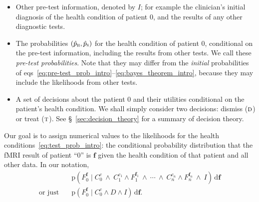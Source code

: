 \documentclass[%
]{frontiersSCNS-nologo} %
\newcommand*{\sect}{\S} %
\newcommand*{\eqns}{eqs}
\newcommand*{\di}{\mathrm{d}}%
\newcommand*{\pf}{\mathrm{p}}%
\renewcommand*{\|}{\mathpunct{|}}%
\newcommand*{\Land}{\mathbin{\ \land\ }}
\newcommand*{\yH}{C}
\newcommand*{\yh}{c}
\newcommand*{\yhu}{\textsc{h}}
\newcommand*{\yhd}{\textsc{s}}
\newcommand*{\yD}{D}
\newcommand*{\yF}{F}
\newcommand*{\yf}{\bm{f}}
\newcommand*{\ypph}{\Hat{p}_{\yhu}}
\newcommand*{\ypps}{\Hat{p}_{\yhd}}
\newcommand*{\yn}{n}
\newcommand*{\yI}{I}
\newcommand*{\yT}{\textsc{t}}
\newcommand*{\ynT}{\textsc{d}}
\begin{document}
\begin{itemize}[para]
\item Other pre-test information, denoted by $\yI$; for example the
  clinician's initial diagnosis of the health condition of patient $0$, and
  the results of any other diagnostic tests.

\item The probabilities $(\ypph,\ypps)$ for the health condition of patient
  $0$, conditional on the pre-test information, including the results from
  other tests. We call these \emph{pre-test probabilities}. Note that they
  may differ from the \emph{initial} probabilities of
  \eqns~\eqref{eq:pre-test_prob_intro}--\eqref{eq:bayes_theorem_intro},
  because they may include the likelihoods from other tests.

\item A set of decisions about the patient $0$ and their utilities
  conditional on the patient's health condition. We shall simply consider
  two decisions: dismiss ($\ynT$) or treat ($\yT$). See
  \sect~\ref{sec:decision_theory} for a summary of decision theory.
\end{itemize}

Our goal is to assign numerical values to the likelihoods for the health
conditions~\eqref{eq:test_prob_intro}: the conditional probability
distribution that the fMRI result of patient \enquote{$0$} is $\yf$ given
the health condition of that patient and all other data. In our notation,
\begin{equation}
    \label{eq:goal_1st}
    \begin{aligned}
  &\pf( \yF_0^{\yf} \| \yH_0^{\yh} \Land
  \yH_1^{\yh_1}\land \yF_1^{\yf_1}\Land
  \dotsb\Land
  \yH_{\yn}^{\yh_{\yn}}\land \yF_{\yn}^{\yf_{\yn}}\Land
    \yI )\,\di\yf
    \\
  \text{or just}\quad
    &\pf( \yF_0^{\yf} \| \yH_0^{\yh} \land \yD \land \yI)\,\di\yf.
    \end{aligned}
\end{equation}
\end{document}
